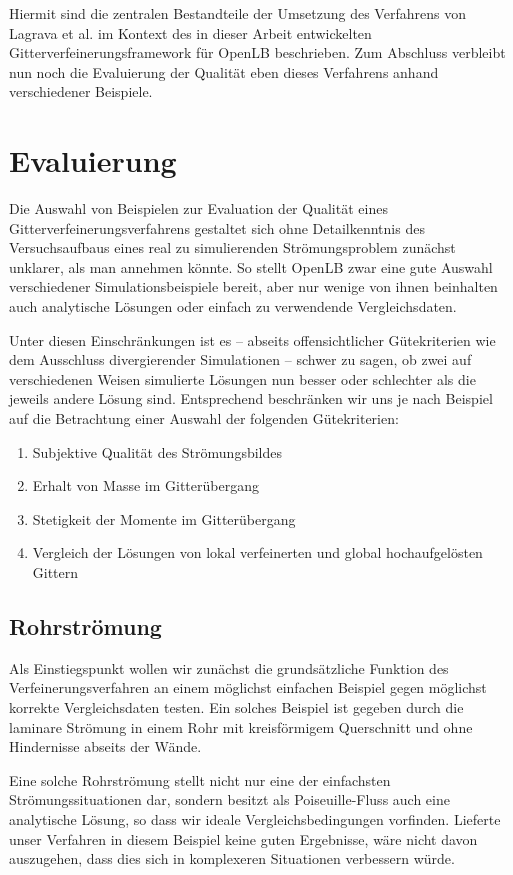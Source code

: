 Hiermit sind die zentralen Bestandteile der Umsetzung des Verfahrens von Lagrava et al. im Kontext des in dieser Arbeit entwickelten Gitterverfeinerungsframework für OpenLB beschrieben. Zum Abschluss verbleibt nun noch die Evaluierung der Qualität eben dieses Verfahrens anhand verschiedener Beispiele.

\newpage
\section{Evaluierung}

Die Auswahl von Beispielen zur Evaluation der Qualität eines Gitterverfeinerungsverfahrens gestaltet sich ohne Detailkenntnis des Versuchsaufbaus eines real zu simulierenden Strömungsproblem zunächst unklarer, als man annehmen könnte. So stellt OpenLB zwar eine gute Auswahl verschiedener Simulationsbeispiele bereit, aber nur wenige von ihnen beinhalten auch analytische Lösungen oder einfach zu verwendende Vergleichsdaten.

Unter diesen Einschränkungen ist es -- abseits offensichtlicher Gütekriterien wie dem Ausschluss divergierender Simulationen -- schwer zu sagen, ob zwei auf verschiedenen Weisen simulierte Lösungen nun besser oder schlechter als die jeweils andere Lösung sind. Entsprechend beschränken wir uns je nach Beispiel auf die Betrachtung einer Auswahl der folgenden Gütekriterien:
\begin{enumerate}
	\item Subjektive Qualität des Strömungsbildes
	\item Erhalt von Masse im Gitterübergang
	\item Stetigkeit der Momente im Gitterübergang
	\item Vergleich der Lösungen von lokal verfeinerten und global hochaufgelösten Gittern
\end{enumerate}

\subsection{Rohrströmung}

Als Einstiegspunkt wollen wir zunächst die grundsätzliche Funktion des Verfeinerungsverfahren an einem möglichst einfachen Beispiel gegen möglichst korrekte Vergleichsdaten testen. Ein solches Beispiel ist gegeben durch die laminare Strömung in einem Rohr mit kreisförmigem Querschnitt und ohne Hindernisse abseits der Wände.

Eine solche Rohrströmung stellt nicht nur eine der einfachsten Strömungssituationen dar, sondern besitzt als Poiseuille-Fluss auch eine analytische Lösung, so dass wir ideale Vergleichsbedingungen vorfinden. Lieferte unser Verfahren in diesem Beispiel keine guten Ergebnisse, wäre nicht davon auszugehen, dass dies sich in komplexeren Situationen verbessern würde.

